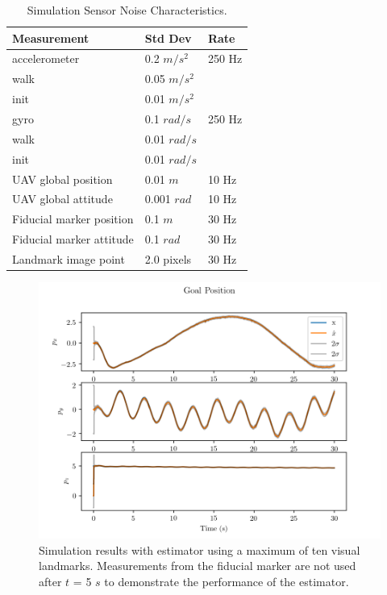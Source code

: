 \begin{table}[h!]
  \begin{center}
    \caption{Simulation Sensor Noise Characteristics.}
    \label{tab:sim_noise}
    \begin{tabular}{l|l|l}
      \textbf{Measurement} & \textbf{Std Dev} & \textbf{Rate} \\
      \hline
      accelerometer & 0.2 $m/s^2$ & 250 Hz \\
      walk & 0.05 $m/s^2$  \\
      init & 0.01 $m/s^2$ \\
      gyro & 0.1 $rad/s$ & 250 Hz \\
      walk & 0.01 $rad/s$  \\
      init & 0.01 $rad/s$ \\
      UAV global position & 0.01 $m$ & 10 Hz \\
      UAV global attitude & 0.001 $rad$ & 10 Hz \\
      Fiducial marker position & 0.1 $m$ & 30 Hz \\
      Fiducial marker attitude & 0.1 $rad$ & 30 Hz \\
      Landmark image point & 2.0 pixels & 30 Hz \\
    \end{tabular}
  \end{center}
\end{table}

\begin{figure}
  \centering
  \includegraphics[scale=0.5]{plots/with_lms_gp.png}
  \caption{Simulation results with estimator using a maximum of ten visual
  landmarks. Measurements from the fiducial marker are not used after $t$ = 5
$s$ to demonstrate the performance of the estimator.}
  \label{fig:with_lms_gp}
\end{figure}

